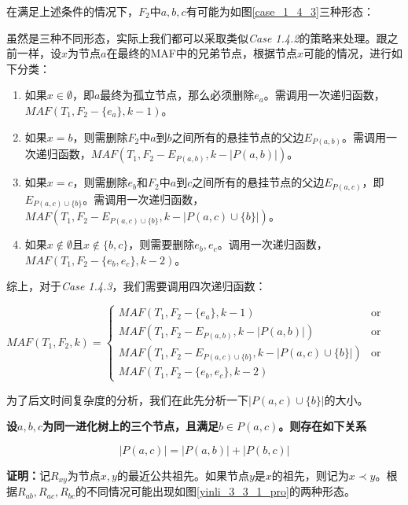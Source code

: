 在满足上述条件的情况下，$F_2$中$a,b,c$有可能为如图\ref{case_1_4_3}三种形态：

虽然是三种不同形态，实际上我们都可以采取类似\textit{Case 1.4.2}的策略来处理。跟之前一样，设$x$为节点$a$在最终的MAF中的兄弟节点，根据节点$x$可能的情况，进行如下分类：
\begin{enumerate}
	\item 如果$x \in \emptyset$，即$a$最终为孤立节点，那么必须删除$e_a$。需调用一次递归函数，$MAF(T_1,F_2-\{e_a\},k-1)$。
	\item 如果$x = b$，则需删除$F_2$中$a$到$b$之间所有的悬挂节点的父边$E_{P(a,b)}$。需调用一次递归函数，$MAF(T_1,F_2-E_{P(a,b)},k-|P(a,b)|)$。
	\item 如果$x = c$，则需删除$e_b$和$F_2$中$a$到$c$之间所有的悬挂节点的父边$E_{P(a,c)}$，即$E_{P(a,c) \cup \{b\}}$。需调用一次递归函数，$MAF(T_1,F_2-E_{P(a,c) \cup \{b\}},k-|P(a,c) \cup \{b\}|)$。
	\item 如果$x \notin \emptyset$且$x \notin \{b,c\}$，则需要删除$e_b,e_c$。调用一次递归函数，$MAF(T_1,F_2-\{e_b,e_c\},k-2)$。
\end{enumerate}
\clearpage
综上，对于\textit{Case 1.4.3}，我们需要调用四次递归函数：
\begin{center}
$MAF(T_1,F_2,k) = \left\{
\begin{array}{lr}
         MAF(T_1,F_2-\{e_a\},k-1) & \mbox{or}\\ 
         MAF(T_1,F_2-E_{P(a,b)},k-|P(a,b)|) & \mbox{or}\\
         MAF(T_1,F_2-E_{P(a,c) \cup \{b\}},k-|P(a,c) \cup \{b\}|) & \mbox{or}\\
         MAF(T_1,F_2-\{e_b,e_c\},k-2) & 
\end{array}
\right.$
\end{center}

为了后文时间复杂度的分析，我们在此先分析一下$|P(a,c) \cup \{b\}|$的大小。

\begin{yinli}\label{yinli2}
\textbf{	
设$a,b,c$为同一进化树上的三个节点，且满足$b \in P(a,c)$。则存在如下关系}
\end{yinli}
\begin{equation*}
\textbf{$|P(a,c)| = |P(a,b)|+|P(b,c)|$}
\end{equation*}

\textbf{证明：}记$R_{xy}$为节点$x,y$的最近公共祖先。如果节点$y$是$x$的祖先，则记为$x \prec y$。根据$R_{ab},R_{ac},R_{bc}$的不同情况可能出现如图\ref{yinli_3_3_1_pro}的两种形态。

